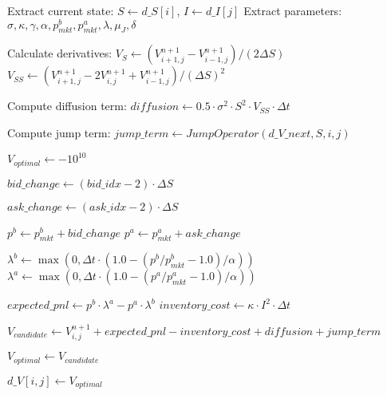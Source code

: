 \documentclass[onecolumn,ieee]{arithmaxresearch}
\begin{document}
\begin{onecolumn}
\begin{algorithm}
\begin{algorithmic}[1]
    \State Extract current state: $S \gets d\_S[i]$, $I \gets d\_I[j]$
    \State Extract parameters: $\sigma, \kappa, \gamma, \alpha, p^b_{mkt}, p^a_{mkt}, \lambda, \mu_J, \delta$
    
    \State Calculate derivatives:
    \State $V_S \gets (V^{n+1}_{i+1,j} - V^{n+1}_{i-1,j})/(2\Delta S)$
    \State $V_{SS} \gets (V^{n+1}_{i+1,j} - 2V^{n+1}_{i,j} + V^{n+1}_{i-1,j})/(\Delta S)^2$
    
    \State Compute diffusion term: $diffusion \gets 0.5 \cdot \sigma^2 \cdot S^2 \cdot V_{SS} \cdot \Delta t$
    
    \State Compute jump term: $jump\_term \gets JumpOperator(d\_V\_next, S, i, j)$
    
    \State $V_{optimal} \gets -10^{10}$ 
    
     
        \State $bid\_change \gets (bid\_idx - 2) \cdot \Delta S$
        
            \State $ask\_change \gets (ask\_idx - 2) \cdot \Delta S$
            
            \State $p^b \gets p^b_{mkt} + bid\_change$
            \State $p^a \gets p^a_{mkt} + ask\_change$
            
             
            
                \State $\lambda^b \gets \max(0, \Delta t \cdot (1.0 - (p^b/p^b_{mkt} - 1.0)/\alpha))$
                \State $\lambda^a \gets \max(0, \Delta t \cdot (1.0 - (p^a/p^a_{mkt} - 1.0)/\alpha))$
                
                \State $expected\_pnl \gets p^b \cdot \lambda^a - p^a \cdot \lambda^b$
                \State $inventory\_cost \gets \kappa \cdot I^2 \cdot \Delta t$
                
                \State $V_{candidate} \gets V^{n+1}_{i,j} + expected\_pnl - inventory\_cost + diffusion + jump\_term$
                
                    \State $V_{optimal} \gets V_{candidate}$
                \EndIf
            \EndIf
        \EndFor
    \EndFor
    
    \State $d\_V[i,j] \gets V_{optimal}$
\EndIf
\end{algorithmic}
\end{algorithm}



\end{onecolumn}
\end{document}
